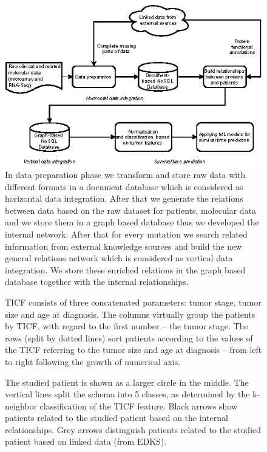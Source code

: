 \documentclass{bmcart}
\def\texttt{[image: ]}
\begin{document}
\begin{backmatter}
\begin{figure}[h!]
  \centering
  \includegraphics{Fig3.eps}
  \caption{
    In data preparation phase we transform and store raw data with different formats in a document database which is considered as horizontal data integration. After that we generate the relations between data based on the raw dataset for patients, molecular data and we store them in a graph based database thus we developed the internal network. After that for every mutation we search related information from external knowledge sources and build the new general relations network which is considered as vertical data integration. We store these enriched relations in the graph based database together with the internal relationships.
  }
  \label{figure_3}
\end{figure}



\begin{figure}[h!]
  \centering
  \texttt{[image: Fig4.eps]}
  \caption{
     TICF consists of three concatenated
parameters: tumor stage, tumor size and age at diagnosis. The columns
virtually group the patients by TICF, with regard to the first number
{}-- the tumor stage. The rows (split by dotted lines) sort patients
according to the values of the TICF referring to the tumor size and age
at diagnosis {}-- from left to right following the growth of numerical
axis. 
  }
  \label{figure_4}
\end{figure}



\begin{figure}[h!]
  \centering
  \texttt{[image: Fig5.eps]}
  \caption{
     The studied patient is shown as a larger circle in the
middle. The vertical lines split the schema into 5 classes, as
determined by the k-neighbor classification of the TICF feature. Black
arrows show patients related to the studied patient based on the
internal relationships. Grey arrows distinguish patients related to the
studied patient based on linked data (from EDKS).
  }
  \label{figure_5}
\end{figure}



\end{backmatter}
\end{document}
